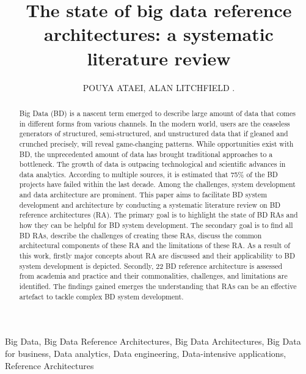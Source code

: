 \documentclass{ieeeaccess}
\begin{document}

\title{The state of big data reference architectures: a
systematic literature review}

\author{\uppercase{Pouya Ataei},
\uppercase{Alan Litchfield} .}

\address[1]{School of Engineering, Computer and Mathematical Sciences, Auckland University of Technology, Auckland, New Zealand (e-mail: pouya.ataei@aut.ac.nz)}

\address[2]{Service and Cloud Computing Research Lab, Auckland University of Technology, Auckland, New Zealand (e-mail: alan.litchfield@aut.ac.nz)}

\begin{abstract}
    Big Data (BD) is a nascent term emerged to describe large amount of data that comes in different forms from various channels. In the modern world, users are the ceaseless generators of structured, semi-structured, and unstructured data that if gleaned and crunched precisely, will reveal game-changing patterns. While opportunities exist with BD, the unprecedented amount of data has brought traditional approaches to a bottleneck. The growth of data is outpacing technological and scientific advances in data analytics. According to multiple sources, it is estimated that 75\% of the BD projects have failed within the last decade. Among the challenges, system development and data architecture are prominent. This paper aims to facilitate BD system development and architecture by conducting a systematic literature review on BD reference architectures (RA). The primary goal is to highlight the state of BD RAs and how they can be helpful for BD system development. The secondary goal is to find all BD RAs, describe the challenges of creating these RAs, discuss the common architectural components of these RA and the limitations of these RA. As a result of this work, firstly major concepts about RA are discussed and their applicability to BD system development is depicted. Secondly, 22 BD reference architecture is assessed from academia and practice and their commonalities, challenges, and limitations are identified. The findings gained emerges the understanding that RAs can be an effective artefact to tackle complex BD system development.
\end{abstract}

\begin{keywords}
    Big Data, Big Data Reference Architectures, Big Data Architectures, Big Data for business, Data analytics, Data engineering, Data-intensive applications, Reference Architectures
\end{keywords}
\end{document}
